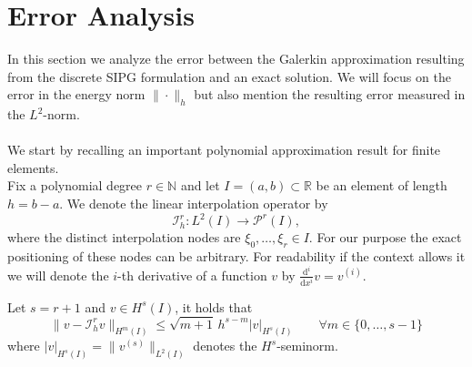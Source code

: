 \section{Error Analysis}
In this section we analyze the error between the Galerkin approximation resulting from the discrete SIPG formulation and an exact solution. 
We will focus on the error in the energy norm $\| \cdot \|_{h}$ but also mention the resulting error measured in the $L^2$-norm.
\\ \\
We start by recalling an important polynomial approximation result for finite elements. \\
Fix a polynomial degree $r \in \mathbb{N}$ and let $I = (a, b) \subset \mathbb{R}$ be an element of length $h = b-a$. We denote the linear interpolation operator by
\begin{equation}
	\mathcal{I}_h^r : L^2(I) \to \mathcal{P}^r(I),
\end{equation}
where the distinct interpolation nodes are $\xi_0,\ldots,\xi_r \in I$. For our purpose the exact positioning of these nodes can be arbitrary. 
For readability if the context allows it we will denote the $i$-th derivative of a function $v$ by $\frac{\text{d}^i}{\text{d} x^i} v = v^{(i)}$.
\begin{lemma}
	Let $s = r+1$ and $v \in H^s(I)$, it holds that 
	\begin{equation*}
		\| v - \mathcal{I}_h^r v \|_{H^m(I)} \leq \sqrt{m+1}\, h^{s-m} |v|_{H^s(I)} \qquad \forall m \in \{0,\ldots,s-1\}
	\end{equation*} 
	where $|v|_{H^s(I)} = \| v^{(s)} \|_{L^2(I)}$ denotes the $H^s$-seminorm. \\ 
\end{lemma}
